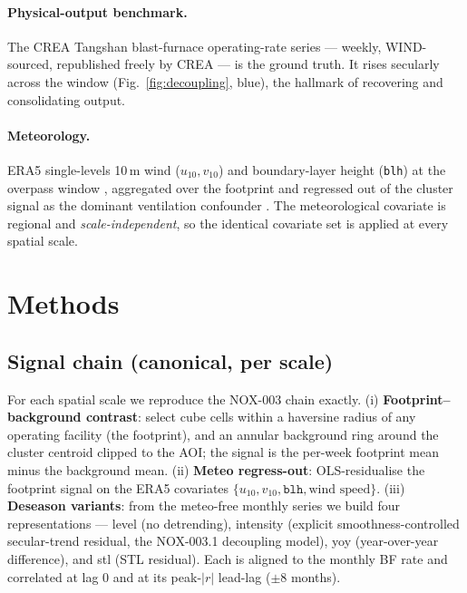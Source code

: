 \documentclass[11pt,a4paper]{article}
\begin{document}
\paragraph{Physical-output benchmark.} The CREA Tangshan blast-furnace operating-rate series
\citep{crea_steel_benchmark} --- weekly, WIND-sourced, republished freely by CREA --- is the
ground truth. It rises secularly across the window (Fig.~\ref{fig:decoupling}, blue), the
hallmark of recovering and consolidating output.

\paragraph{Meteorology.} ERA5 single-levels 10\,m wind ($u_{10},v_{10}$) and boundary-layer
height (\texttt{blh}) at the overpass window \citep{hersbach_2020_era5,cds_era5}, aggregated
over the footprint and regressed out of the cluster signal as the dominant ventilation
confounder \citep{li_2024_nox_trends}. The meteorological covariate is regional and
\emph{scale-independent}, so the identical covariate set is applied at every spatial scale.

\section{Methods}
\label{sec:methods}

\subsection{Signal chain (canonical, per scale)}
For each spatial scale we reproduce the NOX-003 chain exactly. (i) \textbf{Footprint--background
contrast}: select cube cells within a haversine radius of any operating facility (the
footprint), and an annular background ring around the cluster centroid clipped to the AOI;
the signal is the per-week footprint mean minus the background mean. (ii) \textbf{Meteo
regress-out}: OLS-residualise the footprint signal on the ERA5 covariates
$\{u_{10},v_{10},\texttt{blh},\text{wind speed}\}$. (iii) \textbf{Deseason variants}: from the
meteo-free monthly series we build four representations --- \textsf{level} (no detrending),
\textsf{intensity} (explicit smoothness-controlled secular-trend residual, the NOX-003.1
decoupling model), \textsf{yoy} (year-over-year difference), and \textsf{stl} (STL residual).
Each is aligned to the monthly BF rate and correlated at lag $0$ and at its peak-$|r|$ lead-lag
($\pm8$ months).
\end{document}
